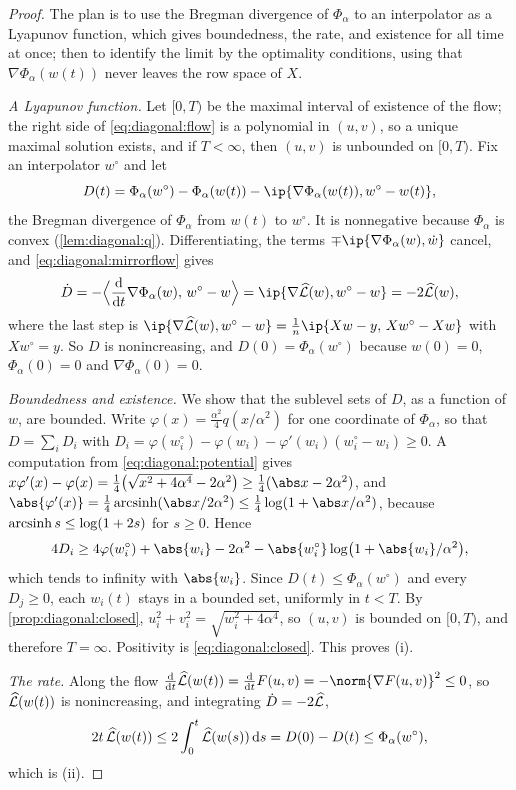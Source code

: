 \begin{refsection}
\begin{proof}
The plan is to use the Bregman divergence of $\Phi_\alpha$ to an interpolator as a Lyapunov function, which gives boundedness, the rate, and existence for all time at once; then to identify the limit by the optimality conditions, using that $\nabla\Phi_\alpha(w(t))$ never leaves the row space of $X$.

\emph{A Lyapunov function.} Let $[0,T)$ be the maximal interval of existence of the flow; the right side of \eqref{eq:diagonal:flow} is a polynomial in $(u,v)$, so a unique maximal solution exists, and if $T<\infty$, then $(u,v)$ is unbounded on $[0,T)$. Fix an interpolator $w^\circ$ and let
\[
  D(t)=\Phi_\alpha(w^\circ)-\Phi_\alpha(w(t))-\ip{\nabla\Phi_\alpha(w(t)),w^\circ-w(t)},
\]
the Bregman divergence of $\Phi_\alpha$ from $w(t)$ to $w^\circ$. It is nonnegative because $\Phi_\alpha$ is convex (\cref{lem:diagonal:q}). Differentiating, the terms $\mp\ip{\nabla\Phi_\alpha(w),\dot w}$ cancel, and \eqref{eq:diagonal:mirrorflow} gives
\[
  \dot D=-\Bigl\langle\frac{\mathrm d}{\mathrm dt}\nabla\Phi_\alpha(w),\,w^\circ-w\Bigr\rangle=\ip{\nabla\Lhat(w),w^\circ-w}=-2\Lhat(w),
\]
where the last step is $\ip{\nabla\Lhat(w),w^\circ-w}=\frac1n\ip{Xw-y,\,Xw^\circ-Xw}$ with $Xw^\circ=y$. So $D$ is nonincreasing, and $D(0)=\Phi_\alpha(w^\circ)$ because $w(0)=0$, $\Phi_\alpha(0)=0$ and $\nabla\Phi_\alpha(0)=0$.

\emph{Boundedness and existence.} We show that the sublevel sets of $D$, as a function of $w$, are bounded. Write $\varphi(x)=\frac{\alpha^2}4q(x/\alpha^2)$ for one coordinate of $\Phi_\alpha$, so that $D=\sum_iD_i$ with $D_i=\varphi(w_i^\circ)-\varphi(w_i)-\varphi'(w_i)(w_i^\circ-w_i)\ge0$. A computation from \eqref{eq:diagonal:potential} gives $x\varphi'(x)-\varphi(x)=\frac14\bigl(\sqrt{x^2+4\alpha^4}-2\alpha^2\bigr)\ge\frac14(\abs x-2\alpha^2)$, and $\abs{\varphi'(x)}=\frac14\arcsinh(\abs x/2\alpha^2)\le\frac14\log(1+\abs x/\alpha^2)$, because $\operatorname{arcsinh} s\le\log(1+2s)$ for $s\ge0$. Hence
\[
  4D_i\ge4\varphi(w_i^\circ)+\abs{w_i}-2\alpha^2-\abs{w^\circ_i}\log\bigl(1+\abs{w_i}/\alpha^2\bigr),
\]
which tends to infinity with $\abs{w_i}$. Since $D(t)\le\Phi_\alpha(w^\circ)$ and every $D_j\ge0$, each $w_i(t)$ stays in a bounded set, uniformly in $t<T$. By \cref{prop:diagonal:closed}, $u_i^2+v_i^2=\sqrt{w_i^2+4\alpha^4}$, so $(u,v)$ is bounded on $[0,T)$, and therefore $T=\infty$. Positivity is \eqref{eq:diagonal:closed}. This proves (i).

\emph{The rate.} Along the flow $\frac{\mathrm d}{\mathrm dt}\Lhat(w(t))=\frac{\mathrm d}{\mathrm dt}F(u,v)=-\norm{\nabla F(u,v)}^2\le0$, so $\widehat{\mathcal{L}}(w(t))$ is nonincreasing, and integrating $\dot D=-2\widehat{\mathcal{L}}$,
\[
  2t\,\widehat{\mathcal{L}}(w(t))\le2\int_0^t\widehat{\mathcal{L}}(w(s))\,\mathrm ds=D(0)-D(t)\le\Phi_\alpha(w^\circ),
\]
which is (ii).


\end{proof}
\end{refsection}

